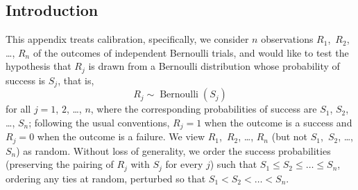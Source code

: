 \documentclass{article}
\DeclareMathOperator{\Bernoulli}{Bernoulli}
\begin{document}
\subsection{Introduction}
\label{aintro}

This appendix treats calibration, specifically,
we consider $n$ observations $R_1$,~$R_2$, \dots, $R_n$ of the outcomes
of independent Bernoulli trials, and would like to test the hypothesis
that $R_j$ is drawn from a Bernoulli distribution whose probability of success
is $S_j$, that is,
%
\begin{equation}
\label{null}
R_j \sim \Bernoulli(S_j)
\end{equation}
%
for all $j = 1$, $2$, \dots, $n$, where the corresponding probabilities
of success are $S_1$, $S_2$, \dots, $S_n$;
following the usual conventions, $R_j = 1$ when the outcome is a success
and $R_j = 0$ when the outcome is a failure.
We view $R_1$,~$R_2$, \dots, $R_n$ (but not $S_1$,~$S_2$, \dots, $S_n$)
as random. Without loss of generality, we order the success probabilities
(preserving the pairing of $R_j$ with $S_j$ for every $j$)
such that $S_1 \le S_2 \le \dots \le S_n$, ordering any ties at random,
perturbed so that $S_1 < S_2 < \dots < S_n$.
\end{document}
